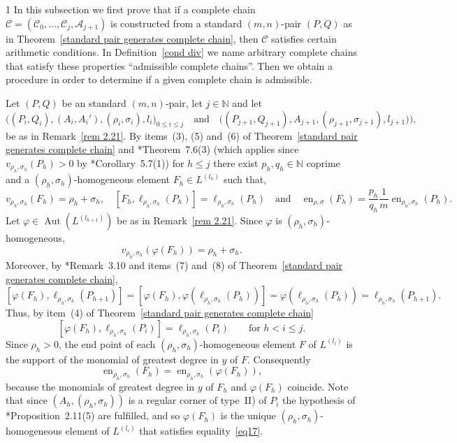 \documentclass[reqno,a4paper,twoside]{amsart}
\theoremstyle{definition}
\theoremstyle{remark}
\DeclareMathOperator{\Aut}{Aut}
\DeclareMathOperator{\en}{en}
\begin{document}
\begin{spacing}{1}
In this subsection we first prove that if a complete chain $\mathscr{C} = (\mathcal{C}_0,\dots,\mathcal{C}_j,\mathcal{A}_{j+1})$ is constructed from a standard $(m,n)$-pair $(P,Q)$ as in Theorem~\ref{standard pair generates complete chain}, then $\mathscr{C}$ satisfies certain arithmetic conditions. In Definition~\ref{cond div} we name arbitrary complete chains that satisfy these properties ``admissible complete chains''. Then we obtain a procedure in order to determine if a given complete chain is admissible.

\smallskip

Let $(P,Q)$ be an standard $(m,n)$-pair, let $j\in \mathds{N}$ and let
$$
\bigl((P_i,Q_i),(A_i,A_i'),(\rho_i,\sigma_i),l_i\bigr)_{0\le i\le j}\quad\text{and}\quad \bigl((P_{j+1},Q_{j+1}),A_{j+1},(\rho_{j+1},\sigma_{j+1}),l_{j+1}\bigr)),
$$
be as in Remark~\ref{rem 2.21}. By items~(3), (5) and~(6) of Theorem~\ref{standard pair generates complete chain} and \cite{GGV1}*{The\-orem~7.6(3)} (which applies since $v_{\rho_h,\sigma_h}(P_h)>0$ by \cite{GGV1}*{Corollary~5.7(1)}) for $h\le j$ there exist $p_h,q_h\in \mathds{N}$ coprime and a $(\rho_h,\sigma_h)$-homogeneous element $F_h\in L^{(l_h)}$ such that,
\begin{equation*}
v_{\rho_h,\sigma_h}(F_h) = \rho_h\!+\!\sigma_h,\quad [F_h,\ell_{\rho_h,\sigma_h}(P_h)] = \ell_{\rho_h,\sigma_h}(P_h) \quad\text{and}\quad \en_{\rho,\sigma}(F_h) = \frac{p_h}{q_h}\frac{1}{m}\en_{\rho_h,\sigma_h}(P_h).
\end{equation*}
Let $\varphi\in \Aut(L^{(l_{h+1})})$ be as in Remark~\ref{rem 2.21}. Since $\varphi$ is $(\rho_h,\sigma_h)$-homogeneous,
$$
v_{\rho_h,\sigma_h}(\varphi(F_h)) = \rho_h+\sigma_h.
$$
Moreover, by \cite{GGV1}*{Remark~3.10} and items~(7) and~(8) of Theorem~\ref{standard pair generates complete chain},
$$
[\varphi(F_h),\ell_{\rho_h,\sigma_h}(P_{h+1})] = [\varphi(F_h),\varphi(\ell_{\rho_h,\sigma_h}(P_h))] = \varphi(\ell_{\rho_h,\sigma_h}(P_h)) = \ell_{\rho_h,\sigma_h}(P_{h+1}).
$$
Thus, by item~(4) of Theorem~\ref{standard pair generates complete chain}
\begin{equation}\label{eq17}
[\varphi(F_h),\ell_{\rho_h,\sigma_h}(P_i)] = \ell_{\rho_h,\sigma_h}(P_i)\qquad\text{for $h<i\le j$.}
\end{equation}
Since $\rho_h>0$, the end point of each $(\rho_h,\sigma_h)$-homogeneous element $F$ of $L^{(l_i)}$ is the support of the monomial of greatest degree in $y$ of $F$. Consequently
$$
\en_{\rho_h,\sigma_h}(F_h) = \en_{\rho_h,\sigma_h}(\varphi(F_h)),
$$
because the monomials of greatest degree in $y$ of $F_h$ and $\varphi(F_h)$ coincide. Note that since $(A_h,(\rho_h,\sigma_h))$ is a regular corner of type~II) of $P_i$ the hypothesis of \cite{GGV1}*{Proposition~2.11(5)} are fulfilled, and so $\varphi(F_h)$ is the unique $(\rho_h,\sigma_h)$-homogeneous element of $L^{(l_i)}$ that satisfies equality~\eqref{eq17}.


\end{spacing}
\end{document}
